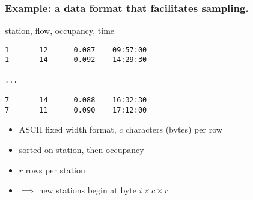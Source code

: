 \documentclass{beamer}
\begin{document}
\begin{frame}[fragile]

    \frametitle{Example: a data format that facilitates sampling.}


station, flow, occupancy, time
\begin{verbatim}
1       12      0.087    09:57:00
1       14      0.092    14:29:30

...

7       14      0.088    16:32:30
7       11      0.090    17:12:00
\end{verbatim}

    \begin{itemize}

        \item ASCII fixed width format, $c$ characters (bytes) per row
        \item sorted on station, then occupancy
        \item $r$ rows per station
        \item $\implies$ new stations begin at byte $i \times c \times r$

    \end{itemize}

%
%
%
%
%
%
%
%
%
%
%
%    
%



\end{frame}
\end{document}

